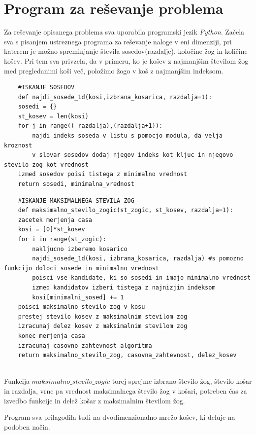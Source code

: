 \documentclass[a4paper, 11pt]{article}
\begin{document}
\section{Program za reševanje problema}
Za reševanje opisanega problema sva uporabila programski jezik \emph{Python}. Začela sva s pisanjem ustreznega programa za reševanje
naloge v eni dimenziji, pri katerem je možno spreminjanje števila sosedov(razdalje), koločine žog in količine košev. Pri tem sva privzela, da v
primeru, ko je košev z najmanjšim številom žog med pregledanimi koši več, položimo žogo v koš z najmanjšim indeksom. 

\begin{verbatim}
    #ISKANJE SOSEDOV
    def najdi_sosede_1d(kosi,izbrana_kosarica, razdalja=1):
    sosedi = {}
    st_kosev = len(kosi)
    for j in range((-razdalja),(razdalja+1)):
        najdi indeks soseda v listu s pomocjo modula, da velja kroznost
        v slovar sosedov dodaj njegov indeks kot kljuc in njegovo stevilo zog kot vrednost
    izmed sosedov poisi tistega z minimalno vrednost
    return sosedi, minimalna_vrednost
\end{verbatim}

\pagebreak
\begin{verbatim}
    #ISKANJE MAKSIMALNEGA STEVILA ZOG
    def maksimalno_stevilo_zogic(st_zogic, st_kosev, razdalja=1):
    zacetek merjenja casa
    kosi = [0]*st_kosev
    for i in range(st_zogic):
        nakljucno izberemo kosarico
        najdi_sosede_1d(kosi, izbrana_kosarica, razdalja) #s pomozno funkcijo doloci sosede in minimalno vrednost
        poisci vse kandidate, ki so sosedi in imajo minimalno vrednost
        izmed kandidatov izberi tistega z najnizjim indeksom
        kosi[minimalni_sosed] += 1 
    poisci maksimalno stevilo zog v kosu
    prestej stevilo kosev z maksimalnim stevilom zog
    izracunaj delez kosev z maksimalnim stevilom zog
    konec merjenja casa
    izracunaj casovno zahtevnost algoritma
    return maksimalno_stevilo_zog, casovna_zahtevnost, delez_kosev


\end{verbatim}

Funkcija $maksimalno\_stevilo\_zogic$ torej sprejme izbrano število žog, število košar in razdalja, vrne pa vrednost maksimalnega število žog v košari,
potreben čas za izvedbo funkcije in delež košar z maksimalnim številom žog.

Program sva prilagodila tudi na dvodimenzionalno mrežo košev, ki deluje na podoben način.
\bigbreak
\end{document}
